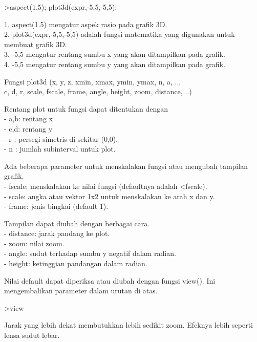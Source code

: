 \documentclass{article}
\begin{document}
\begin{eulernotebook}
\begin{eulercomment}
\begin{eulercomment}
\begin{euleroutput}
\end{euleroutput}
\begin{eulerprompt}
>aspect(1.5); plot3d(expr,-5,5,-5,5):
\end{eulerprompt}
\begin{eulercomment}
1. aspect(1.5) mengatur aspek rasio pada grafik 3D.\\
2. plot3d(expr,-5,5,-5,5) adalah fungsi matematika yang digunakan
untuk membuat grafik 3D.\\
3. -5,5 mengatur rentang sumbu x yang akan ditampilkan pada grafik.\\
4. -5,5 mengatur rentang sumbu y yang akan ditampilkan pada grafik.

\end{eulercomment}
\begin{eulercomment}
Fungsi plot3d (x, y, z, xmin, xmax, ymin, ymax, n, a,  ..,\\
c, d, r, scale, fscale, frame, angle, height, zoom, distance, ..)

Rentang plot untuk fungsi dapat ditentukan dengan\\
- a,b: rentang x\\
- c,d: rentang y\\
- r : persegi simetris di sekitar (0,0).\\
- n : jumlah subinterval untuk plot.

Ada beberapa parameter untuk menskalakan fungsi atau mengubah tampilan
grafik.\\
- fscale: menskalakan ke nilai fungsi (defaultnya adalah \textless{}fscale).\\
- scale: angka atau vektor 1x2 untuk menskalakan ke arah x dan y.\\
- frame: jenis bingkai (default 1).

Tampilan dapat diubah dengan berbagai cara.\\
- distance: jarak pandang ke plot.\\
- zoom: nilai zoom.\\
- angle: sudut terhadap sumbu y negatif dalam radian.\\
- height: ketinggian pandangan dalam radian.

Nilai default dapat diperiksa atau diubah dengan fungsi view(). Ini
mengembalikan parameter dalam urutan di atas.
\end{eulercomment}
\begin{eulerprompt}
>view 
\end{eulerprompt}
\begin{euleroutput}
  [5,  2.6,  2,  0.4]
\end{euleroutput}
\begin{eulercomment}
Jarak yang lebih dekat membutuhkan lebih sedikit zoom. Efeknya lebih
seperti lensa sudut lebar.


\end{eulercomment}
\end{eulercomment}
\end{eulercomment}
\end{eulernotebook}
\end{document}

